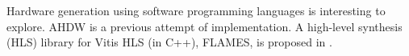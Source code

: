 Hardware generation using software programming languages is interesting to explore.
AHDW \cite{zhao2023automatic} is a previous attempt of implementation.
A high-level synthesis (HLS) library for Vitis HLS (in C++), FLAMES,
is proposed in \cite{zhao2024flexible}.

